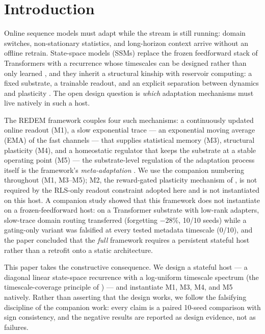 \documentclass[preprint,12pt]{elsarticle}
\begin{document}
\section{Introduction}
\label{sec:intro}

Online sequence models must adapt while the stream is still running:
domain switches, non-stationary statistics, and long-horizon context
arrive without an offline retrain. State-space models (SSMs) replace
the frozen feedforward stack of Transformers with a recurrence whose
timescales can be designed rather than only learned
\cite{gu2022s4,gu2023mamba}, and they inherit a structural kinship
with reservoir computing: a fixed substrate, a trainable readout, and
an explicit separation between dynamics and plasticity
\cite{lukosevicius2009,jaeger2001esn}. The open design question is
\emph{which} adaptation mechanisms must live natively in such a host.

The REDEM framework couples four such mechanisms: a continuously
updated online readout (M1), a slow exponential trace --- an
exponential moving average (EMA) of the fast channels --- that
supplies statistical memory (M3), structural plasticity (M4), and a
homeostatic regulator that keeps the substrate at a stable operating
point (M5) --- the substrate-level regulation of the adaptation
process itself is the framework's \emph{meta-adaptation}
\cite{redemb}. We use the companion numbering throughout (M1, M3--M5);
M2, the reward-gated plasticity mechanism of \cite{redemb}, is not
required by the RLS-only readout constraint adopted here and is not
instantiated on this host. A companion study \cite{redemc} showed
that this framework does not instantiate on a frozen-feedforward host:
on a Transformer substrate with low-rank adapters, slow-trace domain
routing transferred (forgetting $-28\%$, 10/10 seeds) while a
gating-only variant was falsified at every tested metadata timescale
(0/10), and the paper concluded that the \emph{full} framework
requires a persistent stateful host rather than a retrofit onto a
static architecture.

This paper takes the constructive consequence. We design a stateful
host --- a diagonal linear state-space recurrence with a log-uniform
timescale spectrum (the timescale-coverage principle of
\cite{redemc}) --- and instantiate M1, M3, M4, and M5 natively.
Rather than asserting that the design works, we follow the falsifying
discipline of the companion work: every claim is a paired 10-seed
comparison with sign consistency, and the negative results are
reported as design evidence, not as failures.
\end{document}
